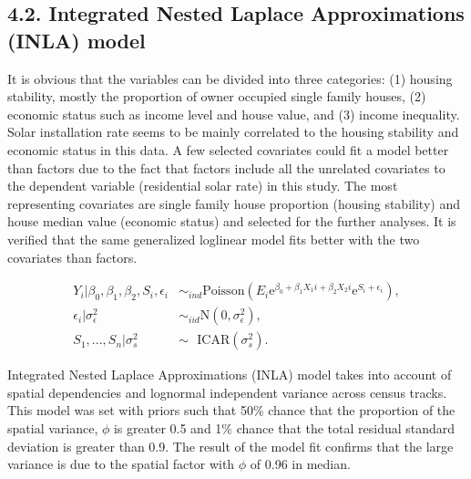 \documentclass[11pt,]{article}
\begin{document}
\hypertarget{integrated-nested-laplace-approximations-inla-model}{%
\subsection{4.2. Integrated Nested Laplace Approximations (INLA)
model}\label{integrated-nested-laplace-approximations-inla-model}}

It is obvious that the variables can be divided into three categories:
(1) housing stability, mostly the proportion of owner occupied single
family houses, (2) economic status such as income level and house value,
and (3) income inequality. Solar installation rate seems to be mainly
correlated to the housing stability and economic status in this data. A
few selected covariates could fit a model better than factors due to the
fact that factors include all the unrelated covariates to the dependent
variable (residential solar rate) in this study. The most representing
covariates are single family house proportion (housing stability) and
house median value (economic status) and selected for the further
analyses. It is verified that the same generalized loglinear model fits
better with the two covariates than factors.

\[
\begin{aligned}
Y_i |\beta_{0},\beta_{1},\beta_{2},S_i,\epsilon_i & \sim_{ind} \mbox{Poisson}(E_i \mbox{e}^{\beta_{0}+\beta_{1}X_1i+\beta_{2}X_2i} \mbox{e}^{S_i + \epsilon_i}),\\ 
\epsilon_i | \sigma_\epsilon^{2} & \sim_{iid} \mbox{N}(0,\sigma_\epsilon^{2}),\\ 
S_1,...,S_n | \sigma_s^{2} & \sim ~~~ \mbox{ICAR}(\sigma_s^{2}). 
\end{aligned} 
\]

Integrated Nested Laplace Approximations (INLA) model takes into account
of spatial dependencies and lognormal independent variance across census
tracks. This model was set with priors such that 50\% chance that the
proportion of the spatial variance, \(\phi\) is greater 0.5 and 1\%
chance that the total residual standard deviation is greater than 0.9.
The result of the model fit confirms that the large variance is due to
the spatial factor with \(\phi\) of 0.96 in median.
\end{document}

